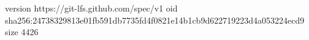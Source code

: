 version https://git-lfs.github.com/spec/v1
oid sha256:24738329813e01fb591db7735fd4f0821e14b1cb9d622719223d4a053224ecd9
size 4426
